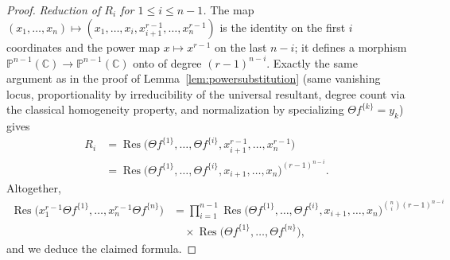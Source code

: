 \documentclass[10pt,a4paper]{amsart}
\newcommand{\Res}{\operatorname{Res}}
\theoremstyle{plain}
\theoremstyle{definition}
\begin{document}
\begin{proof}
\emph{Reduction of $R_i$ for $1\leqslant i \leqslant n-1$.} The map $(x_1,\dots,x_n) \mapsto (x_1,\dots,x_i,x_{i+1}^{r-1},\dots,x_n^{r-1})$ is the identity on the first $i$ coordinates and the power map $x\mapsto x^{r-1}$ on the last $n-i$; it defines a morphism $\mathbb{P}^{n-1}(\mathbb{C})\to\mathbb{P}^{n-1}(\mathbb{C})$ onto of degree $(r-1)^{n-i}$. Exactly the same argument as in the proof of Lemma~\ref{lem:powersubstitution} (same vanishing locus, proportionality by irreducibility of the universal resultant, degree count via the classical homogeneity property, and normalization by specializing $\Theta f^{\{k\}}=y_k$) gives
\begin{align*}
R_i &= \Res\big(\Theta f^{\{1\}},\dots,\Theta f^{\{i\}},x_{i+1}^{r-1},\dots,x_n^{r-1}\big) \\
&= \Res\big(\Theta f^{\{1\}},\dots,\Theta f^{\{i\}},x_{i+1},\dots,x_n\big)^{(r-1)^{n-i}}.
\end{align*}
Altogether,
\begin{align*}
\Res\big(x_1^{r-1}\Theta f^{\{1\}},\dots,x_n^{r-1}\Theta f^{\{n\}}\big) &= \prod_{i=1}^{n-1}\Res\big(\Theta f^{\{1\}},\dots,\Theta f^{\{i\}},x_{i+1},\dots,x_n\big)^{\binom{n}{i}(r-1)^{n-i}} \\
&\quad\times \Res\big(\Theta f^{\{1\}},\dots,\Theta f^{\{n\}}\big),
\end{align*}
and we deduce the claimed formula.
\end{proof}
\end{document}
